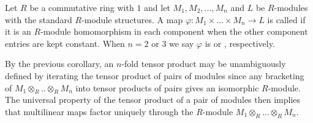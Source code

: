 \documentclass[12pt, a4paper, oneside, openright, titlepage]{book}
\begin{document}
\begin{defn}
    Let $R$ be a commutative ring with $1$ and let $M_1,M_2,...,M_n$ and $L$ be $R$-modules with the standard $R$-module structures. A map $\varphi:M_1\times...\times M_n\rightarrow L$ is called  if it is an $R$-module homomorphism in each component when the other component entries are kept constant. When $n = 2$ or $3$ we say $\varphi$ is  or , respectively.
\end{defn}

By the previous corollary, an $n$-fold tensor product may be unambiguously defined by iterating the tensor product of pairs of modules since any bracketing of $M_1\otimes_R..\otimes_R M_n$ into tensor products of pairs gives an isomorphic $R$-module. The universal property of the tensor product of a pair of modules then implies that multilinear maps factor uniquely through the $R$-module $M_1\otimes_R ... \otimes_R M_n$.
\end{document}
